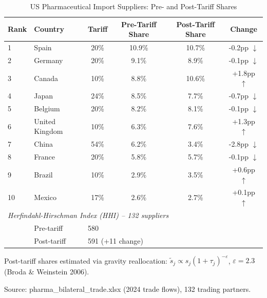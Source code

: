 \begin{table}[H]
\centering
\caption{US Pharmaceutical Import Suppliers: Pre- and Post-Tariff Shares}
\label{tab:pharma_suppliers}
\begin{tabular}{llcccc}
\toprule
Rank & Country & Tariff & Pre-Tariff Share & Post-Tariff Share & Change \\
\midrule
1 & Spain & 20\% & 10.9\% & 10.7\% & -0.2pp $\downarrow$ \\
2 & Germany & 20\% & 9.1\% & 8.9\% & -0.1pp $\downarrow$ \\
3 & Canada & 10\% & 8.8\% & 10.6\% & +1.8pp $\uparrow$ \\
4 & Japan & 24\% & 8.5\% & 7.7\% & -0.7pp $\downarrow$ \\
5 & Belgium & 20\% & 8.2\% & 8.1\% & -0.1pp $\downarrow$ \\
6 & United Kingdom & 10\% & 6.3\% & 7.6\% & +1.3pp $\uparrow$ \\
7 & China & 54\% & 6.2\% & 3.4\% & -2.8pp $\downarrow$ \\
8 & France & 20\% & 5.8\% & 5.7\% & -0.1pp $\downarrow$ \\
9 & Brazil & 10\% & 2.9\% & 3.5\% & +0.6pp $\uparrow$ \\
10 & Mexico & 17\% & 2.6\% & 2.7\% & +0.1pp $\uparrow$ \\
\midrule
\multicolumn{6}{l}{\textit{Herfindahl-Hirschman Index (HHI) -- 132 suppliers}} \\
& Pre-tariff & \multicolumn{4}{l}{580} \\
& Post-tariff & \multicolumn{4}{l}{591 (+11 change)} \\
\bottomrule
\end{tabular}
\begin{tablenotes}
\small
\item Post-tariff shares estimated via gravity reallocation: $\tilde{s}_j \propto s_j(1+\tau_j)^{-\varepsilon}$, $\varepsilon=2.3$ (Broda \& Weinstein 2006).
\item Source: pharma\_bilateral\_trade.xlsx (2024 trade flows), 132 trading partners.
\end{tablenotes}
\end{table}